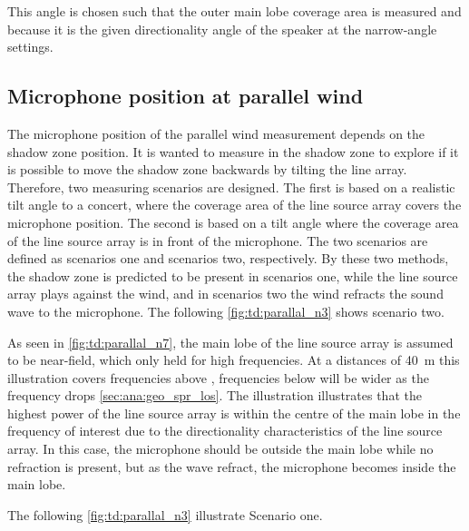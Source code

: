 
This angle is chosen such that the outer main lobe coverage area is measured and because it is the given directionality angle of the speaker at the narrow-angle settings.  


\subsection{Microphone position at parallel wind}
The microphone position of the parallel wind measurement depends on the shadow zone position. It is wanted to measure in the shadow zone to explore if it is possible to move the shadow zone backwards by tilting the line array. Therefore, two measuring scenarios are designed.  The first is based on a realistic tilt angle to a concert, where the coverage area of the line source array covers the microphone position. The second is based on a tilt angle where the coverage area of the line source array is in front of the microphone. The two scenarios are defined as scenarios one and scenarios two, respectively.  By these two methods, the shadow zone is predicted to be present in scenarios one, while the line source array plays against the wind, and in scenarios two the wind refracts the sound wave to the microphone. The following \autoref{fig:td:parallal_n3} shows scenario two.


As seen in \autoref{fig:td:parallal_n7}, the main lobe of the line source array is assumed to be near-field, which only held for high frequencies. At a distances of \SI{40}{\meter} this illustration covers frequencies above , frequencies below will be wider as the frequency drops \autoref{sec:ana:geo_spr_los}. The illustration illustrates that the highest power of the line source array is within the centre of the main lobe in the frequency of interest due to the directionality characteristics of the line source array. In this case, the microphone should be outside the main lobe while no refraction is present, but as the wave refract, the microphone becomes inside the main lobe. 

 The following \autoref{fig:td:parallal_n3} illustrate Scenario one.


